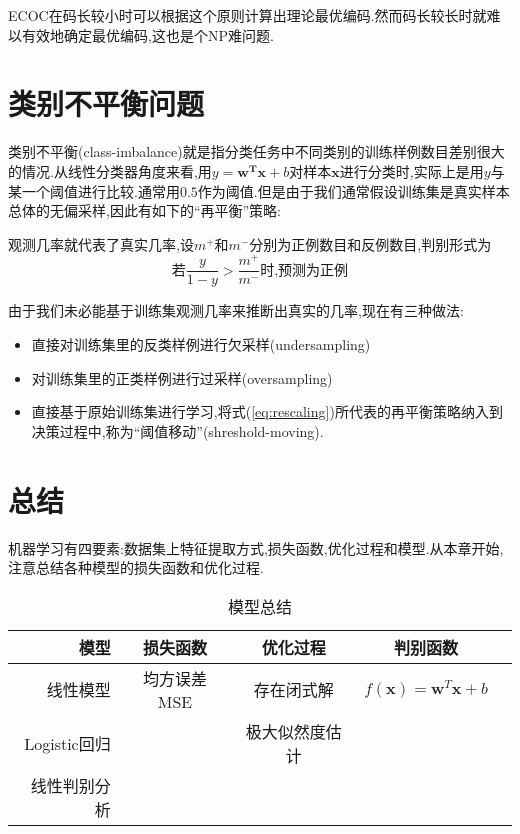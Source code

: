 ECOC在码长较小时可以根据这个原则计算出理论最优编码.然而码长较长时就难以有效地确定最优编码,这也是个NP难问题.

\section{类别不平衡问题}

类别不平衡(class-imbalance)就是指分类任务中不同类别的训练样例数目差别很大的情况.从线性分类器角度来看,用$y=\bm{w^Tx}+b$对样本$\bm x$进行分类时,实际上是用$y$与某一个阈值进行比较.通常用$0.5$作为阈值.但是由于我们通常假设训练集是真实样本总体的无偏采样,因此有如下的``再平衡''策略:

观测几率就代表了真实几率,设$m^+$和$m^-$分别为正例数目和反例数目,判别形式为
\begin{equation}\label{eq:rescaling}
\text{若}\frac{y}{1-y}>\frac{m^+}{m^-}\text{时,预测为正例}
\end{equation}

由于我们未必能基于训练集观测几率来推断出真实的几率,现在有三种做法:
\begin{itemize}
\item 直接对训练集里的反类样例进行欠采样(undersampling)
\item 对训练集里的正类样例进行过采样(oversampling)
\item 直接基于原始训练集进行学习,将式(\ref{eq:rescaling})所代表的再平衡策略纳入到决策过程中,称为``阈值移动''(shreshold-moving).
\end{itemize}

\section*{总结}

机器学习有四要素:数据集上特征提取方式,损失函数,优化过程和模型.从本章开始,注意总结各种模型的损失函数和优化过程.

\begin{table}[!bht]
\caption{模型总结}
\centering
\begin{tabular}{|r|c|c|c|c|}
    \hline
    \textbf{模型} & \textbf{损失函数} & \textbf{优化过程} & \textbf{判别函数} \\ 
    \hline
    线性模型&均方误差MSE&存在闭式解&$f(\bm x)=\bm w^T\bm x+b$\\
    \hline
    Logistic回归&&极大似然度估计&\\
    \hline
    线性判别分析&&&\\
    \hline
\end{tabular}
\end{table}
